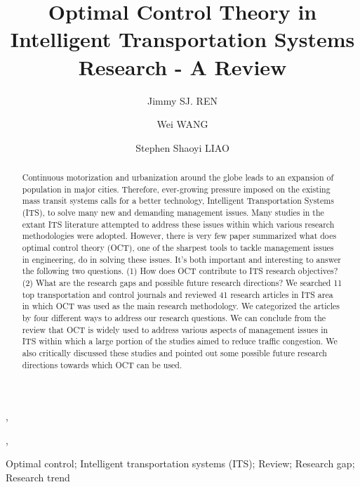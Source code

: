 \documentclass[12pt,onecolumn,twoside]{JCTA}
\theoremstyle{mystyle}
\begin{document}
                          \makeatletter
\def\@autr{{J. Ren} et al.}             \makeatother


\begin{frontmatter}                       
\title{Optimal Control Theory in Intelligent Transportation Systems Research - A Review}\footnotetext



\author[1]{Jimmy SJ. REN},{ }
\author[1]{Wei WANG},{ }
\author[1]{Stephen Shaoyi LIAO}


\address[1]{.Department of Information Systems,
City University of Hong Kong, 83 Tat Chee Ave, Kowloon, Hong Kong SAR,
China}

\begin{keyword}
Optimal control; Intelligent transportation systems (ITS); Review; Research gap; Research trend
\end{keyword}


\begin{abstract}
Continuous motorization and urbanization around the globe leads to an expansion of population in major cities. Therefore, ever-growing pressure imposed on the existing mass transit systems calls for a better technology, Intelligent Transportation Systems (ITS), to solve many new and demanding management issues. Many studies in the extant ITS literature attempted to address these issues within which various research methodologies were adopted. However, there is very few paper summarized what does optimal control theory (OCT), one of the sharpest tools to tackle management issues in engineering, do in solving these issues. It{\textquoteright}s both important and interesting to answer the following two questions. (1) How does OCT contribute to ITS research objectives? (2) What are the research gaps and possible future research directions? We searched 11 top transportation and control journals and reviewed 41 research articles in ITS area in which OCT was used as the main research methodology. We categorized the articles by four different ways to address our research questions. We can conclude from the review that OCT is widely used to address various aspects of management issues in ITS within which a large portion of the studies aimed to reduce traffic congestion. We also critically discussed these studies and pointed out some possible future research directions towards which OCT can be used.
\end{abstract}

\end{frontmatter}
\end{document}
